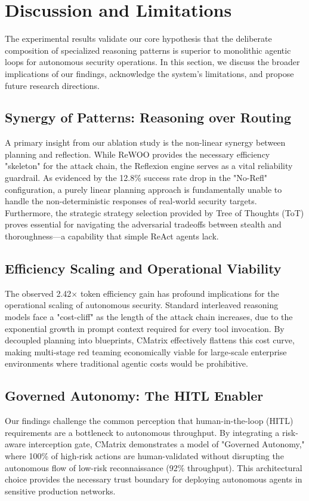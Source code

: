 \section{Discussion and Limitations}

The experimental results validate our core hypothesis that the deliberate composition of specialized reasoning patterns is superior to monolithic agentic loops for autonomous security operations. In this section, we discuss the broader implications of our findings, acknowledge the system's limitations, and propose future research directions.

\subsection{Synergy of Patterns: Reasoning over Routing}
A primary insight from our ablation study is the non-linear synergy between planning and reflection. While ReWOO provides the necessary efficiency "skeleton" for the attack chain, the Reflexion engine serves as a vital reliability guardrail. As evidenced by the 12.8\% success rate drop in the "No-Refl" configuration, a purely linear planning approach is fundamentally unable to handle the non-deterministic responses of real-world security targets. Furthermore, the strategic strategy selection provided by Tree of Thoughts (ToT) proves essential for navigating the adversarial tradeoffs between stealth and thoroughness—a capability that simple ReAct agents lack.

\subsection{Efficiency Scaling and Operational Viability}
The observed 2.42$\times$ token efficiency gain has profound implications for the operational scaling of autonomous security. Standard interleaved reasoning models face a "cost-cliff" as the length of the attack chain increases, due to the exponential growth in prompt context required for every tool invocation. By decoupled planning into blueprints, CMatrix effectively flattens this cost curve, making multi-stage red teaming economically viable for large-scale enterprise environments where traditional agentic costs would be prohibitive.

\subsection{Governed Autonomy: The HITL Enabler}
Our findings challenge the common perception that human-in-the-loop (HITL) requirements are a bottleneck to autonomous throughput. By integrating a risk-aware interception gate, CMatrix demonstrates a model of "Governed Autonomy," where 100\% of high-risk actions are human-validated without disrupting the autonomous flow of low-risk reconnaissance (92\% throughput). This architectural choice provides the necessary trust boundary for deploying autonomous agents in sensitive production networks.

